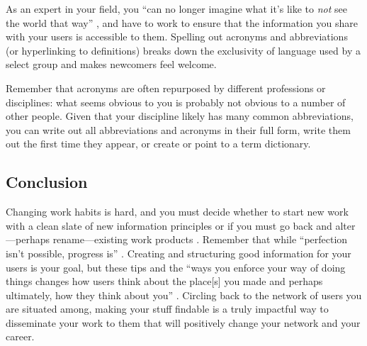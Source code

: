 \documentclass[10pt,letterpaper]{article}
\begin{document}
As an expert in your field, you ``can no longer imagine what it's like
to \emph{not} see the world that way'' \cite{Wilson2020}, and have to work to
ensure that the information you share with your users is accessible to
them. Spelling out acronyms and abbreviations (or hyperlinking to
definitions) breaks down the exclusivity of language used by a select
group and makes newcomers feel welcome.

Remember that acronyms are often repurposed by different professions or
disciplines: what seems obvious to you is probably not obvious to a
number of other people. Given that your discipline likely has many
common abbreviations, you can write out all abbreviations and acronyms
in their full form, write them out the first time they appear, or create
or point to a term dictionary.

\subsection{Conclusion}

Changing work habits is hard, and you must decide whether to start new
work with a clean slate of new information principles or if you must go
back and alter---perhaps rename---existing work products \cite{Briney2015}.
Remember that while ``perfection isn't possible, progress is'' \cite{Covert2014}.
Creating and structuring good information for your users is your goal,
but these tips and the ``ways you enforce your way of doing things
changes how users think about the place[s] you made and perhaps
ultimately, how they think about you'' \cite{Covert2014}. Circling back to the
network of users you are situated among, making your stuff findable is a
truly impactful way to disseminate your work to them that will
positively change your network and your career.


\end{document}

